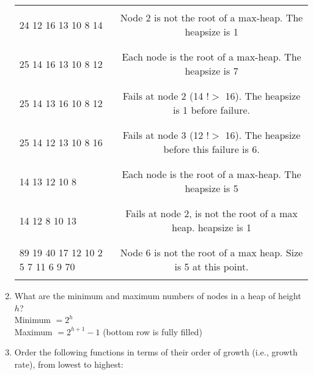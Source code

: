 \documentclass[10pt]{article}
\begin{document}
\begin{enumerate}
\begin{tabular}{| l | c |}
\hline
                    & \\
24 12 16 13 10 8 14 &   Node 2 is not the root of a max-heap. The heapsize is 1\\
                    & \\
                    \hline
                    & \\
25 14 16 13 10 8 12 &   Each node is the root of a max-heap. The heapsize is 7\\
& \\
\hline
                    &  \\
25 14 13 16 10 8 12 & Fails at node 2 (14 $!>$ 16). The heapsize is 1 before failure.  \\
                    &  \\
                    \hline
                    &  \\
25 14 12 13 10 8 16 &  Fails at node 3 (12 $!>$ 16). The heapsize before this failure is 6. \\
                    & \\
\hline
& \\
14 13 12 10 8       & Each node is the root of a max-heap. The heapsize is 5  \\
& \\
\hline
& \\
14 12 8 10 13       & Fails at node 2, is not the root of a max heap. heapsize is 1 \\
& \\
\hline
& \\
89 19 40 17 12 10 2 5 7 11 6 9 70 & Node 6 is not the root of a max heap. Size is 5 at this point.\\
& \\
\hline
\end{tabular}

\vspace{.5in}

\item What are the minimum and maximum numbers of nodes in a heap of height $h$?\\

Minimum $= 2^h$ \\
Maximum $= 2^{h+1} - 1$ (bottom row is fully filled)

\vspace{.5in}

\item Order the following functions in terms
of their order of growth (i.e., growth rate),
from lowest to highest:


\end{enumerate}
\end{document}
